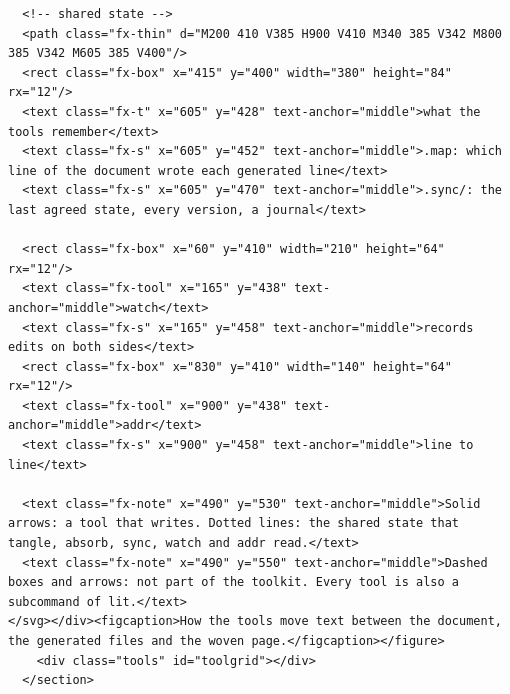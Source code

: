 \documentclass[10pt,a4paper]{article}
\begin{document}
\begin{Verbatim}
  <!-- shared state -->
  <path class="fx-thin" d="M200 410 V385 H900 V410 M340 385 V342 M800 385 V342 M605 385 V400"/>
  <rect class="fx-box" x="415" y="400" width="380" height="84" rx="12"/>
  <text class="fx-t" x="605" y="428" text-anchor="middle">what the tools remember</text>
  <text class="fx-s" x="605" y="452" text-anchor="middle">.map: which line of the document wrote each generated line</text>
  <text class="fx-s" x="605" y="470" text-anchor="middle">.sync/: the last agreed state, every version, a journal</text>

  <rect class="fx-box" x="60" y="410" width="210" height="64" rx="12"/>
  <text class="fx-tool" x="165" y="438" text-anchor="middle">watch</text>
  <text class="fx-s" x="165" y="458" text-anchor="middle">records edits on both sides</text>
  <rect class="fx-box" x="830" y="410" width="140" height="64" rx="12"/>
  <text class="fx-tool" x="900" y="438" text-anchor="middle">addr</text>
  <text class="fx-s" x="900" y="458" text-anchor="middle">line to line</text>

  <text class="fx-note" x="490" y="530" text-anchor="middle">Solid arrows: a tool that writes. Dotted lines: the shared state that tangle, absorb, sync, watch and addr read.</text>
  <text class="fx-note" x="490" y="550" text-anchor="middle">Dashed boxes and arrows: not part of the toolkit. Every tool is also a subcommand of lit.</text>
</svg></div><figcaption>How the tools move text between the document, the generated files and the woven page.</figcaption></figure>
    <div class="tools" id="toolgrid"></div>
  </section>


\end{Verbatim}
\end{document}
